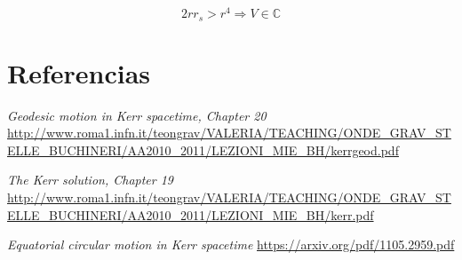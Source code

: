 \documentclass{article}
\begin{document}
\begin{equation}
    2r r_s>r^4 \Rightarrow V\in \mathbb{C}
\end{equation}

\section{Referencias}

\begin{thebibliography}{99}

 \textit{Geodesic motion in Kerr spacetime, Chapter 20}
\url{http://www.roma1.infn.it/teongrav/VALERIA/TEACHING/ONDE_GRAV_STELLE_BUCHINERI/AA2010_2011/LEZIONI_MIE_BH/kerrgeod.pdf}

 \textit{The Kerr solution, Chapter 19}
\url{http://www.roma1.infn.it/teongrav/VALERIA/TEACHING/ONDE_GRAV_STELLE_BUCHINERI/AA2010_2011/LEZIONI_MIE_BH/kerr.pdf}

 \textit{Equatorial circular motion in Kerr spacetime} \url{https://arxiv.org/pdf/1105.2959.pdf}

\end{thebibliography}
\end{document}

